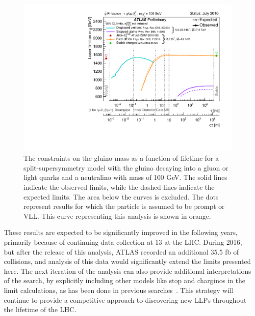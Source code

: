 \begin{figure}[htbp]
\centering
\includegraphics[width=\fullfig]{figures/combined_rhadrons.pdf}  
\caption{The constraints on the gluino mass as a function of lifetime for a split-supersymmetry model with the gluino \rhadrons decaying into a gluon or light quarks and a neutralino with mass of 100 GeV. The solid lines indicate the observed limits, while the dashed lines indicate the expected limits. The area below the curves is excluded. The dots represent results for which the particle is assumed to be prompt or \acs*{VLL}. This curve representing this analysis is shown in orange.}
\label{fig:combined_rhadrons}
\end{figure}

These results are expected to be significantly improved in the following years, primarily because of continuing data collection at 13 \TeV at the \ac{LHC}.
During 2016, but after the release of this analysis, ATLAS recorded an additional 35.5 fb of collisions, and analysis of this data would significantly extend the limits presented here.
The next iteration of the analysis can also provide additional interpretations of the search, by explicitly including other models like stop \rhadrons and charginos in the limit calculations, as has been done in previous searches~\cite{SUSY-2014-09}.
This strategy will continue to provide a competitive approach to discovering new \acp{LLP} throughout the lifetime of the \ac{LHC}.
